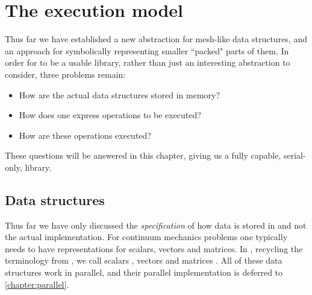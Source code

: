 \documentclass[thesis]{subfiles}
\begin{document}

\chapter{The execution model}
\label{chapter:execution_model}


Thus far we have established a new abstraction for mesh-like data structures, and an approach for symbolically representing smaller ``packed" parts of them.
In order for  to be a usable library, rather than just an interesting abstraction to consider, three problems remain:

\begin{itemize}
  \item How are the actual data structures stored in memory?
  \item How does one express operations to be executed?
  \item How are these operations executed?
\end{itemize}

These questions will be answered in this chapter, giving us a fully capable, serial-only,  library.

\section{Data structures}
\label{sec:data_structures}

Thus far we have only discussed the \textit{specification} of how data is stored in  and not the actual implementation.
For continuum mechanics problems one typically needs to have representations for scalars, vectors and matrices.
In , recycling the terminology from , we call scalars , vectors  and matrices .
All of these data structures work in parallel, and their parallel implementation is deferred to \cref{chapter:parallel}.
\end{document}
